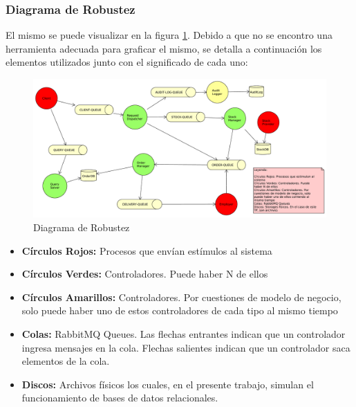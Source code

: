         \subsubsection{Diagrama de Robustez}
        El mismo se puede visualizar en la figura \ref{DiagRobustez}. Debido 
        a que no se encontro una herramienta adecuada para graficar el mismo,
        se detalla a continuación los elementos utilizados junto con el
        significado de cada uno:

        \begin{figure}[!htb]                                             
            \centering                                                   
            \includegraphics[width=20cm,angle=90,origin=c]{Imagenes/robustez.pdf}        
            \caption{Diagrama de Robustez} \label{DiagRobustez}
        \end{figure}

        \begin{itemize}
            \item \textbf{Círculos Rojos:} Procesos que envían estímulos al 
            sistema
            \item \textbf{Círculos Verdes:} Controladores. Puede haber N 
            de ellos          
            \item \textbf{Círculos Amarillos:} Controladores. Por cuestiones
            de modelo de negocio, solo puede haber uno de estos controladores
            de cada tipo al mismo tiempo
            \item \textbf{Colas:} RabbitMQ Queues. Las flechas entrantes        
            indican que un controlador ingresa mensajes en la cola. Flechas
            salientes indican que un controlador saca elementos de la cola.
            \item \textbf{Discos:} Archivos físicos los cuales, en el presente
            trabajo, simulan el funcionamiento de bases de datos relacionales.
        \end{itemize}

